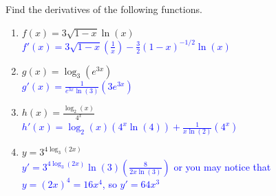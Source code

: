 \documentclass{ximera}
\begin{document}

\begin{exercise}
    Find the derivatives of the following functions.
    \begin{enumerate}
        \item $f(x)=3\sqrt{1-x}\ln(x)$\\
        \textcolor{blue}{$f'(x)=3\sqrt{1-x}\left(\frac{1}{x}\right)-\frac32(1-x)^{-1/2}\ln(x)$}
        \item $g(x)=\log_3(e^{3x})$\\
        \textcolor{blue}{$g'(x)=\frac{1}{e^{3x}\ln(3)}(3e^{3x})$}
        \item $h(x)=\frac{\log_2(x)}{4^x}$\\
        \textcolor{blue}{$h'(x)=\log_2(x)(4^x\ln(4))+\frac{1}{x\ln(2)}(4^x)$}
        \item $y=3^{4\log_3(2x)}$\\
        \textcolor{blue}{$y'=3^{4\log_3(2x)}\ln(3)\left(\frac{8}{2x\ln(3)}\right)$ or you may notice that $y=(2x)^4=16x^4$, so $y'=64x^3$}
    \end{enumerate}
\end{exercise}
\end{document}

